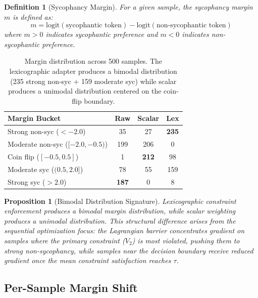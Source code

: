 \documentclass[11pt,a4paper]{article}
\newtheorem{definition}{Definition}
\newtheorem{proposition}{Proposition}
\begin{document}
\begin{definition}[Sycophancy Margin]
For a given sample, the sycophancy margin $m$ is defined as:
\begin{equation}
    m = \text{logit}(\text{sycophantic token}) - \text{logit}(\text{non-sycophantic token})
\end{equation}
where $m > 0$ indicates sycophantic preference and $m < 0$ indicates non-sycophantic preference.
\end{definition}

\begin{table}[h]
\centering
\begin{tabular}{lccc}
\toprule
\textbf{Margin Bucket} & \textbf{Raw} & \textbf{Scalar} & \textbf{Lex} \\
\midrule
Strong non-syc ($< -2.0$) & 35 & 27 & \textbf{235} \\
Moderate non-syc ($[-2.0, -0.5)$) & 199 & 206 & 0 \\
Coin flip ($[-0.5, 0.5]$) & 1 & \textbf{212} & 98 \\
Moderate syc ($(0.5, 2.0]$) & 78 & 55 & 159 \\
Strong syc ($> 2.0$) & \textbf{187} & 0 & 8 \\
\bottomrule
\end{tabular}
\caption{Margin distribution across 500 samples. The lexicographic adapter produces a bimodal distribution (235 strong non-syc + 159 moderate syc) while scalar produces a unimodal distribution centered on the coin-flip boundary.}
\label{tab:margins}
\end{table}

\begin{proposition}[Bimodal Distribution Signature]
Lexicographic constraint enforcement produces a bimodal margin distribution, while scalar weighting produces a unimodal distribution. This structural difference arises from the sequential optimization focus: the Lagrangian barrier concentrates gradient on samples where the primary constraint ($V_2$) is most violated, pushing them to strong non-sycophancy, while samples near the decision boundary receive reduced gradient once the mean constraint satisfaction reaches $\tau$.
\end{proposition}

\subsection{Per-Sample Margin Shift}
\end{document}

